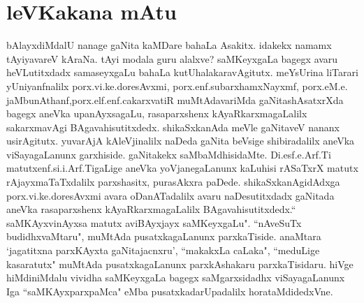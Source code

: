 \chapter{leVKakana mAtu}

bAlayxdiMdalU nanage gaNita kaMDare bahaLa Asakitx. idakekx namamx tAyiyavareV kAraNa. tAyi modala 
guru alalxve? saMKeyxgaLa bagegx avaru heVLutitxdadx samaseyxgaLu bahaLa kutUhalakaravAgitutx. 
meYsUrina liTarari yUniyanfnalilx porx.\hspace{0.1cm}vi.\hspace{0.1cm}ke.\hspace{0.1cm}doresAvxmi, porx.\hspace{0.1cm}enf.\hspace{0.1cm}subarxhamxNayxmf, porx.\hspace{0.1cm}eM.\hspace{0.1cm}e.\hspace{0.1cm} jaMbunAthanf,\break porx.\hspace{0.1cm}elf.\hspace{0.1cm}enf.\hspace{0.1cm}cakarxvatiR muMtAdavariMda gaNitashAsatxrXda bagegx aneVka upanAyxsagaLu, rasaparxshenx kAyaR\-karxmagaLalilx sakarxmavAgi BAgavahisutitxdedx. shikaSxkanAda meVle gaNitaveV nananx usirAgitutx. yuvarAjA kAleVjinalilx naDeda gaNita beVsige shibiradalilx aneVka viSayagaLanunx garxhiside. gaNitakekx saMbaMdhisidaMte. Di.\hspace{0.1cm}esf.\hspace{0.1cm}e.\hspace{0.1cm}Arf.\hspace{0.1cm}Ti matutx\break enf.\hspace{0.1cm}si.\hspace{0.1cm}i.\hspace{0.1cm}Arf.\hspace{0.1cm}TigaLige aneVka yoVjanegaLanunx kaLuhisi rASaTxrX matutx rAjayxmaTaTxdalilx parxshasitx, purasAkxra paDede. shikaSxkanAgidAdxga porx.\hspace{0.1cm}vi.\hspace{0.1cm}ke.\hspace{0.1cm}doresAvxmi avara oDanATadalilx avaru naDesutitxdadx gaNitada aneVka rasaparxshenx kAyaRkarxmagaLalilx BAgavahisutitxdedx.\break `` saMKAyxvinAyxsa matutx aviBAyxjayx saMKeyxgaLu". ``nAveSuTx budidhxvaMtaru", muMtAda pusatxkagaLanunx parxkaTiside. anaMtara `jagatitxna parxKAyxta gaNitajacnxru', ``makakxLa caLaka", ``meduLige kasaratutx" muMtAda pusatxkagaLanunx parxkAshakaru parxkaTisidaru. hiVge hiMdiniMdalu vividha saMKeyxgaLa bagegx saMgarxsidadhx viSayagaLanunx Iga ``saMKAyxparxpaMca" eMba pusatxkadarUpadalilx horataMdidedxVne. 

